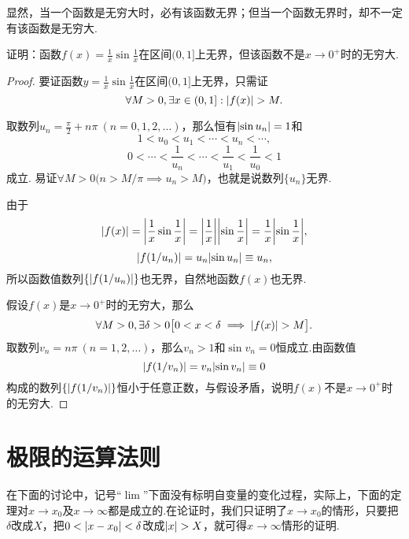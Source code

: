 显然，当一个函数是无穷大时，必有该函数无界；但当一个函数无界时，却不一定有该函数是无穷大.
\begin{example}
证明：函数\(f(x) = \frac{1}{x} \sin\frac{1}{x}\)在区间\((0,1]\)上无界，但该函数不是\(x\to0^+\)时的无穷大.
\begin{proof}
要证函数\(y = \frac{1}{x} \sin\frac{1}{x}\)在区间\((0,1]\)上无界，只需证\[
\forall M > 0, \exists x \in (0,1] : \abs{f(x)} > M.
\]

取数列\(u_n = \frac{\pi}{2} + n\pi\ (n=0,1,2,\dotsc)\)，那么恒有\(\abs{\sin u_n} = 1\)和\[
1 < u_0 < u_1 < \dotsb < u_n < \dotsb,
\]\[
0 < \dotsb < \frac{1}{u_n} < \dotsb < \frac{1}{u_1} < \frac{1}{u_0} < 1
\]成立.
易证\(
\forall M > 0 \bigl(
	n > M/\pi \implies u_n > M
\bigr)
\)，也就是说数列\(\{u_n\}\)无界.

由于\[
\abs{f(x)} = \abs{\frac{1}{x} \sin\frac{1}{x}}
= \abs{\frac{1}{x}} \abs{\sin\frac{1}{x}}
= \frac{1}{x} \abs{\sin\frac{1}{x}},
\]\[
\abs{f(1/u_n)}
= u_n \abs{\sin u_n} \equiv u_n,
\]所以函数值数列\(\{\abs{f(1/u_n)}\}\)也无界，自然地函数\(f(x)\)也无界.


假设\(f(x)\)是\(x\to0^+\)时的无穷大，那么\[
\forall M > 0, \exists \delta > 0 \bigl[
0 < x < \delta \implies \abs{f(x)} > M
\bigr].
\]取数列\(v_n = n\pi\ (n=1,2,\dotsc)\)，那么\(v_n > 1\)和\(\sin v_n = 0\)恒成立.由函数值\[
\abs{f(1/v_n)} = v_n \abs{\sin v_n} \equiv 0
\]构成的数列\(\{\abs{f(1/v_n)}\}\)恒小于任意正数，与假设矛盾，说明\(f(x)\)不是\(x\to0^+\)时的无穷大.
\end{proof}
\end{example}

\section{极限的运算法则}\label{section:极限.极限的运算法则}
在下面的讨论中，记号“\(\lim\)”下面没有标明自变量的变化过程，实际上，下面的定理对\(x \to x_0\)及\(x \to \infty\)都是成立的.在论证时，我们只证明了\(x \to x_0\)的情形，只要把\(\delta\)改成\(X\)，把\(0<\abs{x-x_0}<\delta\)改成\(\abs{x}>X\)，就可得\(x \to \infty\)情形的证明.

